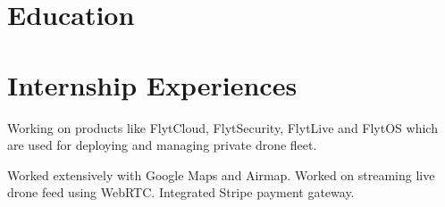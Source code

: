 \documentclass[]{deedy-resume-openfont}
\begin{document}
\begin{minipage}[t]{0.33\textwidth}









%
%

\end{minipage} 
\hfill
\begin{minipage}[t]{0.66\textwidth} 


\section{Education}

 \newline
{}
\vspace{\topsep}
\sectionsep


\sectionsep



\section{Internship Experiences}
\vspace{2mm}
\begin{tightemize}
 \item Working on products like FlytCloud, FlytSecurity, FlytLive and FlytOS which are used for deploying and managing private drone fleet. 
 \item Worked extensively with Google Maps and Airmap. Worked on streaming live drone feed using WebRTC. Integrated Stripe payment gateway. \end{tightemize}



\end{minipage}
\end{document}
